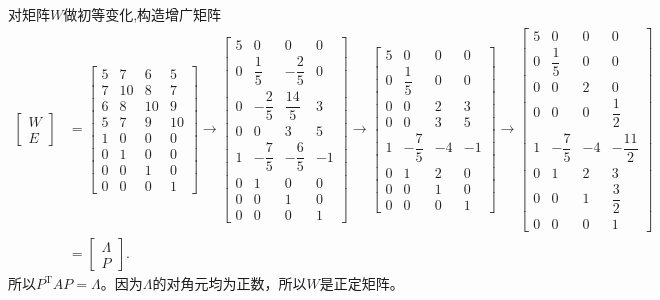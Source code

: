 \begin{solution}
  对矩阵$W$做初等变化,构造增广矩阵
\[\begin{aligned}
\begin{bmatrix} W\\E\end{bmatrix}
&=
\begin{bmatrix}
5 & 7 & 6 & 5 \\
7 & 10 & 8 & 7 \\
6 & 8 & 10 & 9 \\
5 & 7 & 9 & 10 \\
\hline
1 & 0 & 0 & 0 \\
0 & 1 & 0 & 0 \\
0 & 0 & 1 & 0 \\
0 & 0 & 0 & 1
\end{bmatrix}
\rightarrow
\begin{bmatrix}
5 & 0 & 0 & 0 \\[4pt]
0 & \dfrac15 & -\dfrac25 & 0 \\[4pt]
0 & -\dfrac25 & \dfrac{14}{5} & 3 \\[4pt]
0 & 0 & 3 & 5 \\[4pt]
\hline
1 & -\dfrac75 & -\dfrac65 & -1 \\[4pt]
0 & 1 & 0 & 0 \\[4pt]
0 & 0 & 1 & 0 \\[4pt]
0 & 0 & 0 & 1
\end{bmatrix}
\rightarrow
\begin{bmatrix}
5 & 0 & 0 & 0 \\[4pt]
0 & \dfrac15 & 0 & 0 \\[4pt]
0 & 0 & 2 & 3 \\[4pt]
0 & 0 & 3 & 5 \\[4pt]
\hline
1 & -\dfrac75 & -4 & -1 \\[4pt]
0 & 1 & 2 & 0 \\[4pt]
0 & 0 & 1 & 0 \\[4pt]
0 & 0 & 0 & 1
\end{bmatrix}
\rightarrow
\begin{bmatrix}
5 & 0 & 0 & 0 \\[4pt]
0 & \dfrac15 & 0 & 0 \\[4pt]
0 & 0 & 2 & 0 \\[4pt]
0 & 0 & 0 & \dfrac12 \\[4pt]
\hline
1 & -\dfrac75 & -4 & -\dfrac{11}{2} \\[4pt]
0 & 1 & 2 & 3 \\[4pt]
0 & 0 & 1 & \dfrac32 \\[4pt]
0 & 0 & 0 & 1
\end{bmatrix}\\
&=
\begin{bmatrix} \Lambda \\ P \end{bmatrix}.
\end{aligned}\]
所以$P^\mathrm{T}AP=\Lambda$。因为$\Lambda$的对角元均为正数，所以$W$是正定矩阵。
\end{solution}

